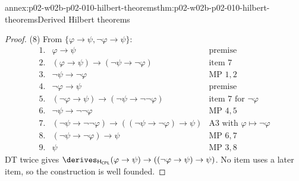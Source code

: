 \begin{annexitem}{annex:p02-w02b-p02-010-hilbert-theorems}{thm:p02-w02b-p02-010-hilbert-theorems}{Derived Hilbert theorems}
\begin{proof}
(8) From \(\{\varphi\to\psi,\neg\varphi\to\psi\}\):
\[
\begin{array}{rll}
1.&\varphi\to\psi&\text{premise}\\
2.&(\varphi\to\psi)\to(\neg\psi\to\neg\varphi)&\text{item 7}\\
3.&\neg\psi\to\neg\varphi&\text{MP }1,2\\
4.&\neg\varphi\to\psi&\text{premise}\\
5.&(\neg\varphi\to\psi)\to(\neg\psi\to\neg\neg\varphi)&\text{item 7 for }\neg\varphi\\
6.&\neg\psi\to\neg\neg\varphi&\text{MP }4,5\\
7.&(\neg\psi\to\neg\neg\varphi)\to((\neg\psi\to\neg\varphi)\to\psi)
  &\text{A3 with }\varphi\mapsto\neg\varphi\\
8.&(\neg\psi\to\neg\varphi)\to\psi&\text{MP }6,7\\
9.&\psi&\text{MP }3,8
\end{array}
\]
DT twice gives
\(\derives_{\mathsf H_{\mathsf{CPL}}}(\varphi\to\psi)\to((\neg\varphi\to\psi)\to\psi)\).
No item uses a later item, so the construction is well founded.
\end{proof}
\end{annexitem}

